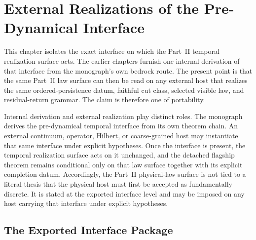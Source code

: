 \section{External Realizations of the Pre-Dynamical Interface}
\label{sec:temporal-interface-portability}

This chapter isolates the exact interface on which the Part~II temporal
realization surface acts. The earlier chapters furnish one internal
derivation of that interface from the monograph's own bedrock route. The
present point is that the same Part~II law surface can then be read on any
external host that realizes the same ordered-persistence datum, faithful cut
class, selected visible law, and residual-return grammar. The claim is
therefore one of portability.

Internal derivation and external realization play distinct roles. The
monograph derives the pre-dynamical temporal interface from its own theorem
chain. An external continuum, operator, Hilbert, or coarse-grained host may
instantiate that same interface under explicit hypotheses. Once the interface
is present, the temporal realization surface acts on it unchanged, and the
detached flagship theorem remains conditional only on that law surface
together with its explicit completion datum.
Accordingly, the Part~II physical-law surface is not tied to a literal thesis
that the physical host must first be accepted as fundamentally discrete. It is
stated at the exported interface level and may be imposed on any host carrying
that interface under explicit hypotheses.

\subsection{The Exported Interface Package}


